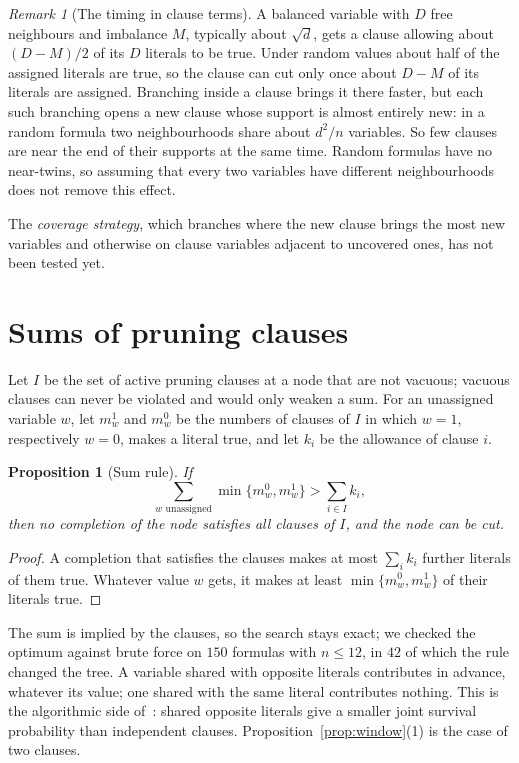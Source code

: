 \documentclass[11pt,a4paper]{article}
\newtheorem{proposition}[theorem]{Proposition}
\theoremstyle{remark}
\newtheorem{remark}[theorem]{Remark}
\begin{document}
\begin{remark}[The timing in clause terms]\label{rem:timing}
A balanced variable with $D$ free neighbours and imbalance $M$, typically about
$\sqrt d$, gets a clause allowing about $(D-M)/2$ of its $D$ literals to be
true. Under random values about half of the assigned literals are true, so the
clause can cut only once about $D-M$ of its literals are assigned. Branching
inside a clause brings it there faster, but each such branching opens a new
clause whose support is almost entirely new: in a random formula two
neighbourhoods share about $d^2/n$ variables. So few clauses are near the end
of their supports at the same time. Random formulas have no near-twins, so
assuming that every two variables have different neighbourhoods does not remove
this effect.
\end{remark}

The \emph{coverage strategy}, which branches where the new clause brings the
most new variables and otherwise on clause variables adjacent to uncovered
ones, has not been tested yet.

\section{Sums of pruning clauses}\label{sec:sums}

Let $I$ be the set of active pruning clauses at a node that are not vacuous;
vacuous clauses can never be violated and would only weaken a sum. For an
unassigned variable $w$, let $m^1_w$ and $m^0_w$ be the numbers of clauses of
$I$ in which $w=1$, respectively $w=0$, makes a literal true, and let $k_i$ be
the allowance of clause $i$.

\begin{proposition}[Sum rule]\label{prop:sum}
If
\[
 \sum_{w\text{ unassigned}}\min\{m^0_w,m^1_w\}>\sum_{i\in I}k_i ,
\]
then no completion of the node satisfies all clauses of $I$, and the node can
be cut.
\end{proposition}

\begin{proof}
A completion that satisfies the clauses makes at most $\sum_ik_i$ further
literals of them true. Whatever value $w$ gets, it makes at least
$\min\{m^0_w,m^1_w\}$ of their literals true.
\end{proof}

The sum is implied by the clauses, so the search stays exact; we checked the
optimum against brute force on $150$ formulas with $n\le12$, in $42$ of which
the rule changed the tree. A variable shared with opposite literals contributes
in advance, whatever its value; one shared with the same literal contributes
nothing. This is the algorithmic side of~\cite[Lemma~27]{N3}: shared opposite
literals give a smaller joint survival probability than independent clauses.
Proposition~\ref{prop:window}(1) is the case of two clauses.
\end{document}

